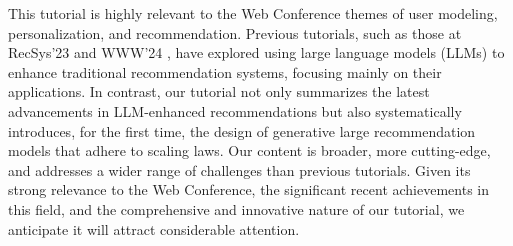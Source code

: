 This tutorial is highly relevant to the Web Conference themes of user modeling, personalization, and recommendation. Previous tutorials, such as those at RecSys'23 \cite{hua2023tutorial} and WWW'24 \cite{zhang2024large}, have explored using large language models (LLMs) to enhance traditional recommendation systems, focusing mainly on their applications. In contrast, our tutorial not only summarizes the latest advancements in LLM-enhanced recommendations but also systematically introduces, for the first time, the design of generative large recommendation models that adhere to scaling laws. Our content is broader, more cutting-edge, and addresses a wider range of challenges than previous tutorials. Given its strong relevance to the Web Conference, the significant recent achievements in this field, and the comprehensive and innovative nature of our tutorial, we anticipate it will attract considerable attention.